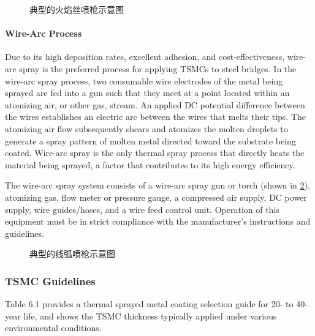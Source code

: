 \begin{figure}
  \caption{典型的火焰丝喷枪示意图}
  \label{fig:flame-wire-spray-gun}
\end{figure}


\paragraph*{Wire-Arc Process}
Due to its high deposition rates, excellent adhesion, and cost-effectiveness, wire-arc spray is the preferred
process for applying TSMCs to steel bridges. In the wire-arc spray process, two consumable wire electrodes of the
metal being sprayed are fed into a gun such that they meet at a point located within an atomizing air, or other gas,
stream. An applied DC potential difference between the wires establishes an electric arc between the wires that melts their tips. The atomizing air flow subsequently shears and atomizes the molten droplets to generate a spray pattern of
molten metal directed toward the substrate being coated. Wire-arc spray is the only thermal spray process that
directly heats the material being sprayed, a factor that contributes to its high energy efficiency.

The wire-arc spray system consists of a wire-arc spray gun or torch (shown in \cref{fig:wire-arc-spray-gun}), atomizing gas, flow
meter or pressure gauge, a compressed air supply, DC power supply, wire guides/hoses, and a wire feed control unit.
Operation of this equipment must be in strict compliance with the manufacturer’s instructions and guidelines.

\begin{figure}
  \caption{典型的线弧喷枪示意图}
  \label{fig:wire-arc-spray-gun}
\end{figure}

\subsubsection{TSMC Guidelines}
Table 6.1 provides a thermal sprayed metal coating selection guide for 20- to 40-year life, and shows the TSMC
thickness typically applied under various environmental conditions.

